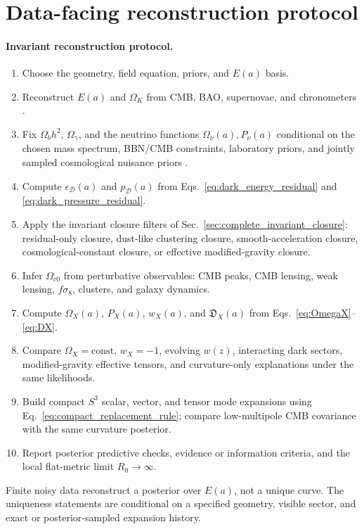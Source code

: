 \documentclass[
  aps,
  prd,
  reprint,
  superscriptaddress,
  nofootinbib,
  floatfix,
  longbibliography
]{revtex4-2}
\theoremstyle{plain}
\theoremstyle{definition}
\theoremstyle{remark}
\newcommand{\D}{\mathcal D}
\newcommand{\Dacc}{\mathfrak D_X}
\begin{document}
\section{Data-facing reconstruction protocol}

\paragraph*{Invariant reconstruction protocol.}
\begin{enumerate}
\item Choose the geometry, field equation, priors, and $E(a)$ basis.
\item Reconstruct $E(a)$ and $\Omega_K$ from CMB, BAO, supernovae, and
chronometers \cite{Moresco2022}.
\item Fix $\Omega_bh^2$, $\Omega_\gamma$, and the neutrino functions
$\Omega_\nu(a),P_\nu(a)$ conditional on the chosen mass spectrum, BBN/CMB
constraints, laboratory priors, and jointly sampled cosmological nuisance priors
\cite{Cooke2018,SchrammTurner1998}.
\item Compute $\epsilon_\D(a)$ and $p_\D(a)$ from
Eqs.~\eqref{eq:dark_energy_residual} and \eqref{eq:dark_pressure_residual}.
\item Apply the invariant closure filters of
Sec.~\ref{sec:complete_invariant_closure}: residual-only closure, dust-like
clustering closure, smooth-acceleration closure, cosmological-constant closure,
or effective modified-gravity closure.
\item Infer $\Omega_{c0}$ from perturbative observables: CMB peaks, CMB lensing,
weak lensing, $f\sigma_8$, clusters, and galaxy dynamics.
\item Compute $\Omega_X(a)$, $P_X(a)$, $w_X(a)$, and $\Dacc(a)$ from
Eqs.~\eqref{eq:OmegaX}--\eqref{eq:DX}.
\item Compare $\Omega_X=\mathrm{const}$, $w_X=-1$, evolving $w(z)$, interacting
dark sectors, modified-gravity effective tensors, and curvature-only
explanations under the same likelihoods.
\item Build compact $S^3$ scalar, vector, and tensor mode expansions using
Eq.~\eqref{eq:compact_replacement_rule}; compare low-multipole CMB covariance
with the same curvature posterior.
\item Report posterior predictive checks, evidence or information criteria, and
the local flat-metric limit $R_0\to\infty$.
\end{enumerate}

Finite noisy data reconstruct a posterior over $E(a)$, not a unique curve.  The
uniqueness statements are conditional on a specified geometry, visible sector,
and exact or posterior-sampled expansion history.
\end{document}
